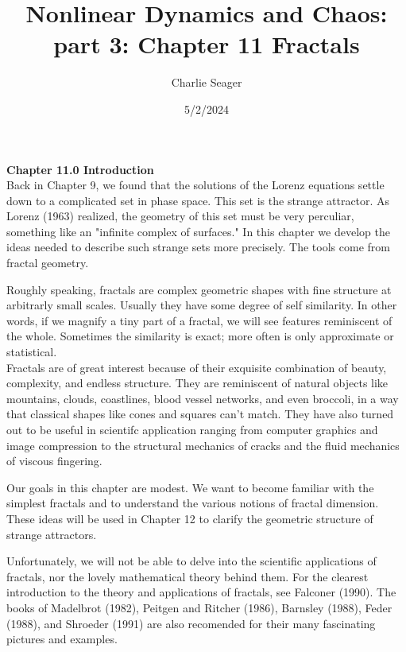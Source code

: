 \documentclass{article}
\newcommand\tab[1][1cm]{\hspace*{#1}}
\begin{document}
\title {Nonlinear Dynamics and Chaos: part 3: Chapter 11 Fractals}

\author{Charlie Seager}

\date{5/2/2024}
\maketitle

\textbf {Chapter 11.0 Introduction} \\

Back in Chapter 9, we found that the solutions of the Lorenz equations settle down to a complicated set in phase space. This set is the strange attractor. As Lorenz (1963) realized, the geometry of this set must be very perculiar, something like an "infinite complex of surfaces." In this chapter we develop the ideas needed to describe such strange sets more precisely. The tools come from fractal geometry. \\ \tab

Roughly speaking, fractals are complex geometric shapes with fine structure at arbitrarly small scales. Usually they have some degree of self similarity. In other words, if we magnify a tiny part of a fractal, we will see features reminiscent of the whole. Sometimes the similarity is exact; more often is only approximate or statistical. \\ \tab
Fractals are of great interest because of their exquisite combination of beauty, complexity, and endless structure. They are reminiscent of natural objects like mountains, clouds, coastlines, blood vessel networks, and even broccoli, in a way that classical shapes like cones and squares can't match. They have also turned out to be useful in scientifc application ranging from computer graphics and image compression to the structural mechanics of cracks and the fluid mechanics of viscous fingering. \\ \tab

Our goals in this chapter are modest. We want to become familiar with the simplest fractals and to understand the various notions of fractal dimension. These ideas will be used in Chapter 12 to clarify the geometric structure of strange attractors. \\ \tab

Unfortunately, we will not be able to delve into the scientific applications of fractals, nor the lovely mathematical theory behind them. For the clearest introduction to the theory and applications of fractals, see Falconer (1990). The books of Madelbrot (1982), Peitgen and Ritcher (1986), Barnsley (1988), Feder (1988), and Shroeder (1991) are also recomended for their many fascinating pictures and examples. \\
\end{document}

